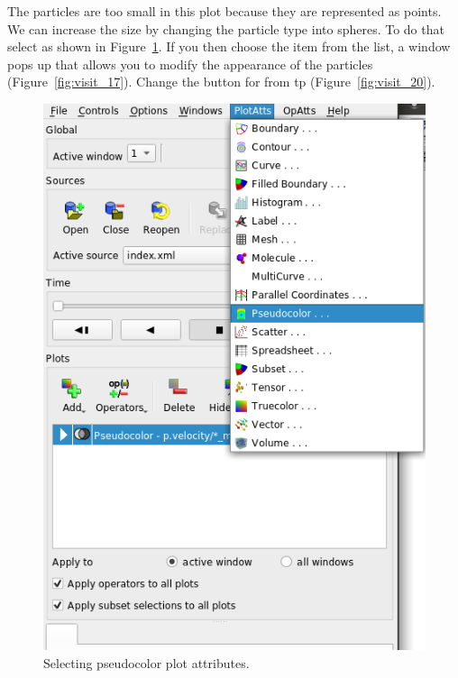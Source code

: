 \begin{paracol}{2}
  The particles are too small in this plot because they are represented as
  points.  We can increase the size by changing the particle type into spheres.
  To do that select  as shown in Figure~\ref{fig:visit_18}.
  If you then choose the  item from the list, a window pops up 
  that allows you to modify the appearance of the particles (Figure~\ref{fig:visit_17}).
  Change the button for  from  tp 
  (Figure~\ref{fig:visit_20}).
  
  \switchcolumn

  \begin{figure}[htb!]
    \centering
    \includegraphics[width=\columnwidth]{FIGS/visit/visit_18.png}
    \caption{Selecting pseudocolor plot attributes.}
    \label{fig:visit_18}
  \end{figure}

\end{paracol}
